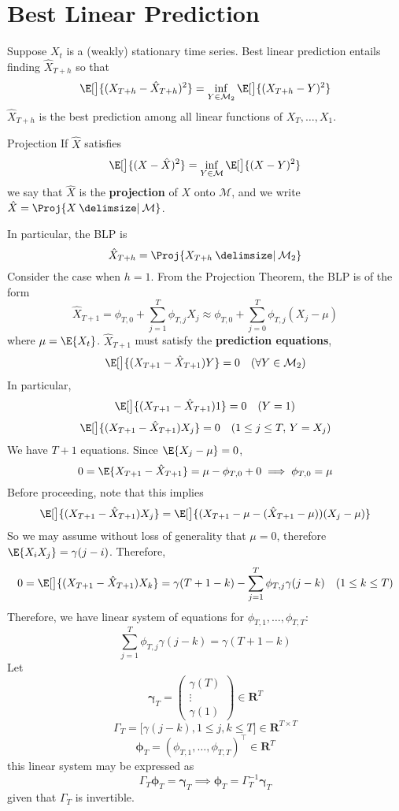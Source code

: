 \section{Best Linear Prediction}
Suppose $ X_t $ is a (weakly) stationary time series.
Best linear prediction entails finding $ \hat{X}_{T+h} $ so that
\[ \E[\big]{(X_{T+h}-\hat{X}_{T+h})^2}=\inf_{Y\in \mathcal{M}_2}\E[\big]{(X_{T+h}-Y)^2} \]
$ \hat{X}_{T+h} $ is the best prediction among all linear
functions of $ X_T,\ldots,X_1 $.
\begin{Definition}{Projection}{}
    If $ \hat{X} $ satisfies
    \[ \E[\big]{(X-\hat{X})^2}=\inf_{Y\in \mathcal{M}}\E[\big]{(X-Y)^2} \]
    we say that $ \hat{X} $ is the \textbf{projection}
    of $ X $ onto $ \mathcal{M} $, and we write $ \hat{X}=\Proj{X\onto \mathcal{M}} $.
\end{Definition}
In particular, the BLP is
\[ \hat{X}_{T+h}=\Proj{X_{T+h}\onto \mathcal{M}_2} \]
Consider the case when $ h=1 $. From the Projection Theorem, the BLP
is of the form
\[ \hat{X}_{T+1}=\phi_{T,0}+\sum_{j=1}^{T} \phi_{T,j}X_j \approx
    \phi_{T,0}+\sum_{j=0}^{T} \phi_{T,j}(X_j-\mu) \]
where $ \mu=\E{X_t} $. $ \hat{X}_{T+1} $ must satisfy
the \textbf{prediction equations},
\[ \E[\big]{(X_{T+1}-\hat{X}_{T+1})Y}=0\quad (\forall  Y\in \mathcal{M}_2 ) \]
In particular,
\[ \E[\big]{(X_{T+1}-\hat{X}_{T+1})1}=0\quad(Y=1) \]
\[ \E[\big]{(X_{T+1}-\hat{X}_{T+1})X_j}=0\quad(1\le j\le T,\, Y=X_j) \]
We have $ T+1 $ equations. Since $ \E{X_{j}-\mu}=0 $,
\[ 0=\E{X_{T+1}-\hat{X}_{T+1}}=\mu-\phi_{T,0}+0\implies \phi_{T,0}=\mu \]
Before proceeding, note that this implies
\[ \E[\big]{(X_{T+1}-\hat{X}_{T+1})X_j}=\E[\big]{(X_{T+1}-\mu-(\hat{X}_{T+1}-\mu))(X_{j}-\mu)} \]
So we may assume without loss of generality that $ \mu=0 $, therefore $ \E{X_i X_j}=\gamma(j-i) $.
Therefore,
\[ 0=\E[\big]{(X_{T+1}-\hat{X}_{T+1})X_k}=\gamma(T+1-k)-\sum_{j=1}^{T} \phi_{T,j}\gamma(j-k)\quad(1\le k\le T) \]
Therefore, we have linear system of equations for $ \phi_{T,1},\ldots,\phi_{T,T} $:
\[ \sum_{j=1}^{T}\phi_{T,j}\gamma(j-k)=\gamma(T+1-k)  \]
Let
\[ \symbf{\gamma}_T=\begin{pmatrix}
        \gamma(T) \\
        \vdots    \\
        \gamma(1)
    \end{pmatrix}\in\mathbf{R}^T \]
\[ \Gamma_T=\bigl[\gamma(j-k),1\le j,k\le T\bigr]\in\mathbf{R}^{T\times T} \]
\[ \symbf{\phi}_T=(\phi_{T,1},\ldots,\phi_{T,T})^\top \in\mathbf{R}^T \]
this linear system may be expressed as
\[ \Gamma_T \symbf{\phi}_T=\symbf{\gamma}_T\implies \symbf{\phi}_T=\Gamma_T^{-1}\symbf{\gamma}_T \]
given that $ \Gamma_T $ is invertible.

